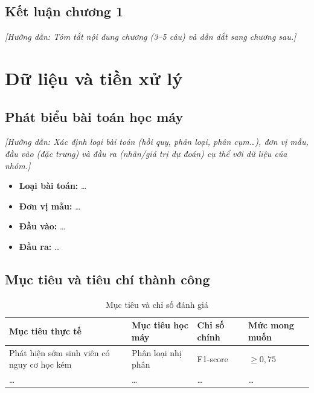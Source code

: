 \documentclass[12pt,a4paper,oneside]{report}
\newcommand{\huongdan}[1]{{\color{guide}\itshape [Hướng dẫn: #1]}}
\begin{document}
\section{Kết luận chương 1}
\huongdan{Tóm tắt nội dung chương (3--5 câu) và dẫn dắt sang chương sau.}

\chapter{Dữ liệu và tiền xử lý}
\label{chap:dulieu}

\section{Phát biểu bài toán học máy}
\huongdan{Xác định loại bài toán (hồi quy, phân loại, phân cụm\dots), đơn vị
mẫu, đầu vào (đặc trưng) và đầu ra (nhãn/giá trị dự đoán) cụ thể với dữ liệu
của nhóm.}

\begin{itemize}
  \item \textbf{Loại bài toán:} \dots
  \item \textbf{Đơn vị mẫu:} \dots
  \item \textbf{Đầu vào:} \dots
  \item \textbf{Đầu ra:} \dots
\end{itemize}

\section{Mục tiêu và tiêu chí thành công}

\begin{table}[H]
  \centering
  \caption{Mục tiêu và chỉ số đánh giá}
  \label{tab:muctieu}
  \begin{tabularx}{\textwidth}{>{\raggedright\arraybackslash}X >{\raggedright\arraybackslash}X
                               >{\centering\arraybackslash}p{2.8cm} >{\centering\arraybackslash}p{2.8cm}}
    \toprule
    \textbf{Mục tiêu thực tế} & \textbf{Mục tiêu học máy} & \textbf{Chỉ số chính} & \textbf{Mức mong muốn} \\
    \midrule
    Phát hiện sớm sinh viên có nguy cơ học kém & Phân loại nhị phân & F1-score & $\geq 0{,}75$ \\
    \dots & \dots & \dots & \dots \\
    \bottomrule
  \end{tabularx}
\end{table}
\end{document}
